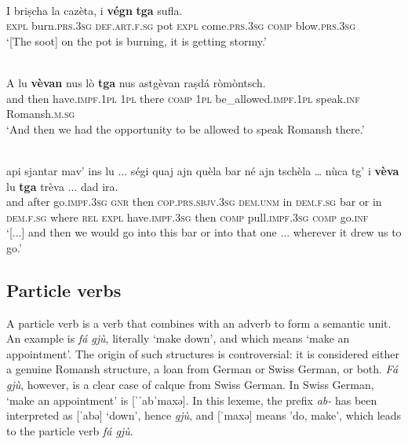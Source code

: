 \ea
\label{ex:vegntga1}
\\
\gll I briṣcha la cazèta, i \textbf{végn} \textbf{tga} sufla. \\
\textsc{expl} burn.\textsc{prs.3sg} \textsc{def.art.f.sg} pot \textsc{expl} come.\textsc{prs.3sg} \textsc{comp} blow.\textsc{prs.3sg} \\
\glt `[The soot] on the pot is burning, it is getting stormy.'
\z

\ea
\label{ex:vajtga2}
\\
\gll    A lu \textbf{vèvan} nus lò \textbf{tga} nus astgèvan raṣdá ròmòntsch.\\
and then have.\textsc{impf.1pl} \textsc{1pl} there \textsc{comp} \textsc{1pl} be\_allowed.\textsc{impf.1pl} speak.\textsc{inf} Romansh.\textsc{m.sg} \\
\glt `And then we had the opportunity to be allowed to speak Romansh there.'
\z

\ea
\label{ex:vajtga3}
\\
\gll  [...] api sjantar mav’ ins lu ... ségi quaj ajn quèla bar né ajn tschèla … nùca tg’ i \textbf{vèva} lu \textbf{tga} trèva ... dad ira.  \\
{} and after go.\textsc{impf.3sg} \textsc{gnr} then {} \textsc{cop.prs.sbjv.3sg} \textsc{dem.unm} in \textsc{dem.f.sg} bar or in \textsc{dem.f.sg} {} where \textsc{rel} \textsc{expl} have.\textsc{impf.3sg} then \textsc{comp} pull.\textsc{impf.3sg} {} \textsc{comp} go.\textsc{inf}\\
\glt `[...] and then we would go into this bar or into that one ... wherever it drew us to go.'
\z



\subsection{Particle verbs}
A particle verb is a verb that combines with an adverb to form a semantic unit. An example is \textit{fá gjù}, literally `make down', and which means `make an appointment'. The origin of such structures is controversial: it is considered either a genuine Romansh structure, a loan from German or Swiss German, or both. \textit{Fá gjù}, however, is a clear case of calque from Swiss German. In Swiss German, `make an appointment' is [ˈˈabˈmaxə]. In this lexeme, the prefix \textit{ab-} has been interpreted as [ˈabə] `down', hence \textit{gjù}, and [ˈmaxə] means 'do, make', which leads to the particle verb \textit{fá gjù}.

